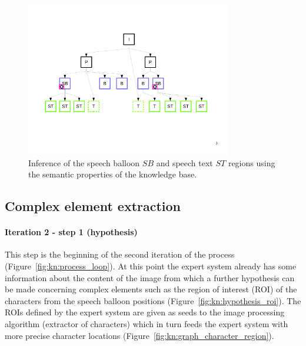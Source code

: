  \begin{figure}[!ht]  %
   \centering
  \includegraphics[trim= 30px 168px 20px 110px, clip, width=0.8\textwidth]{graph_infer_1.pdf}
  \caption[Inference of the speech balloon $SB$ and speech text $ST$ regions using the semantic properties of the knowledge base]{Inference of the speech balloon $SB$ and speech text $ST$ regions using the semantic properties of the knowledge base.%
  }
  \label{fig:kn:graph_specific_types}
 \end{figure}


\subsection{Complex element extraction} %
\label{sub:complex_element_extraction}

\paragraph{Iteration 2 - step 1 (hypothesis)} %
\label{par:step_4}
This step is the beginning of the second iteration of the process (Figure~\ref{fig:kn:process_loop}).
At this point the expert system already has some information about the content of the image from which a further hypothesis can be made concerning complex elements such as the region of interest (ROI) of the characters from the speech balloon positions (Figure~\ref{fig:kn:hypothesis_roi}).
The ROIs defined by the expert system are given as seeds to the image processing algorithm (extractor of characters) which in turn feeds the expert system with more precise character locations (Figure~\ref{fig:kn:graph_character_region}).


